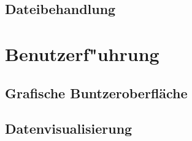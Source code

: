 \subsection{Dateibehandlung}



\section{Benutzerf"uhrung}

\subsection{Grafische Buntzeroberfl\"ache}

\subsection{Datenvisualisierung}

